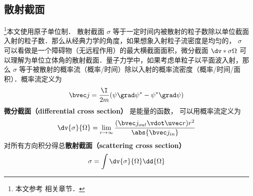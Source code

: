 

\subsection{散射截面}

\footnote{本文参考 \cite{Brandsen} 相关章节．}本文使用原子单位制． 散射截面 $\sigma$ 等于一定时间内被散射的粒子数除以单位截面入射的粒子数．那么从经典力学的角度，如果想象入射粒子流密度是均匀的， $\sigma$ 可以看做是一个障碍物（无远程作用）的最大横截面面积，微分截面 $\dv*{\sigma}{\Omega}$ 可以理解为单位立体角的散射截面．量子力学中，如果考虑单粒子以平面波入射，那么 $\sigma$ 等于被散射的概率流（概率/时间）除以入射的概率流密度（概率/时间/面积）．概率流定义为
\begin{equation}
\bvec j = \frac{\I }{2m}(\psi \grad \psi^* - \psi^* \grad \psi )
\end{equation}
\textbf{微分截面（differential cross section）} 是能量的函数， 可以用概率流定义为
\begin{equation}\label{ParWav_eq3}
\dv{\sigma}{\Omega} = \lim_{r\to\infty} \frac{(\bvec j_{out} \vdot \uvec r) r^2}{\abs{\bvec j_{in}}}
\end{equation}
对所有方向积分得总\textbf{散射截面（scattering cross section）}
\begin{equation}
\sigma = \int \dv{\sigma}{\Omega} \dd{\Omega} 
\end{equation}

